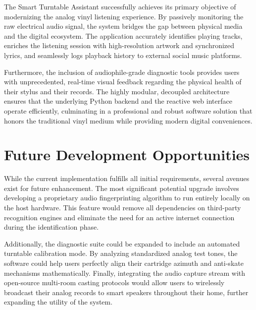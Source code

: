 \documentclass[12pt,a4paper,english]{report}
\begin{document}
The Smart Turntable Assistant successfully achieves its primary objective of modernizing the analog vinyl listening experience. By passively monitoring the raw electrical audio signal, the system bridges the gap between physical media and the digital ecosystem. The application accurately identifies playing tracks, enriches the listening session with high-resolution artwork and synchronized lyrics, and seamlessly logs playback history to external social music platforms. 

Furthermore, the inclusion of audiophile-grade diagnostic tools provides users with unprecedented, real-time visual feedback regarding the physical health of their stylus and their records. The highly modular, decoupled architecture ensures that the underlying Python backend and the reactive web interface operate efficiently, culminating in a professional and robust software solution that honors the traditional vinyl medium while providing modern digital conveniences.

\section{Future Development Opportunities}

While the current implementation fulfills all initial requirements, several avenues exist for future enhancement. The most significant potential upgrade involves developing a proprietary audio fingerprinting algorithm to run entirely locally on the host hardware. This feature would remove all dependencies on third-party recognition engines and eliminate the need for an active internet connection during the identification phase. 

Additionally, the diagnostic suite could be expanded to include an automated turntable calibration mode. By analyzing standardized analog test tones, the software could help users perfectly align their cartridge azimuth and anti-skate mechanisms mathematically. Finally, integrating the audio capture stream with open-source multi-room casting protocols would allow users to wirelessly broadcast their analog records to smart speakers throughout their home, further expanding the utility of the system.
\end{document}
